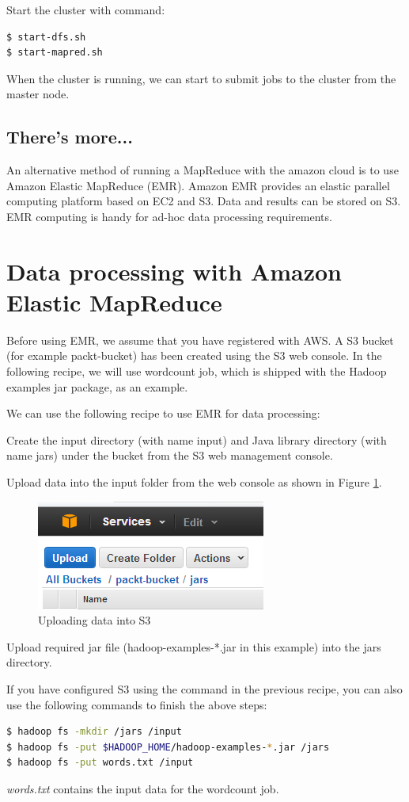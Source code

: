 Start the cluster with command:
\lstset{style=bashstyle}
\begin{lstlisting}[language=bash]
$ start-dfs.sh
$ start-mapred.sh
\end{lstlisting}

When the cluster is running, we can start to submit jobs to the cluster from the master node.
\subsection*{There's more...}
An alternative method of running a MapReduce with the amazon cloud is to use Amazon Elastic MapReduce (EMR). Amazon EMR provides an elastic parallel computing platform based on EC2 and S3. Data and results can be stored on S3. EMR computing is handy for ad-hoc data processing requirements.

\section{Data processing with Amazon Elastic MapReduce}
Before using EMR, we assume that you have registered with AWS. A S3 bucket (for example packt-bucket) has been created using the S3 web console. In the following recipe, we will use wordcount job, which is shipped with the Hadoop examples jar package, as an example.

We can use the following recipe to use EMR for data processing:

Create the input directory (with name input) and Java library directory (with name jars) under the bucket from the S3 web management console.

Upload data into the input folder from the web console as shown in Figure \ref{fig:aws.s3.upload}.
\begin{figure}[ht]
  \centering
  \includegraphics[width=.4\textwidth]{figs/5163os_08_22.png}
  \caption{Uploading data into S3}\label{fig:aws.s3.upload}
\end{figure} 
Upload required jar file (hadoop-examples-*.jar in this example) into the jars directory.

If you have configured S3 using the command in the previous recipe, you can also use the following commands to finish the above steps:
\lstset{style=bashstyle}
\begin{lstlisting}[language=bash]
$ hadoop fs -mkdir /jars /input
$ hadoop fs -put $HADOOP_HOME/hadoop-examples-*.jar /jars
$ hadoop fs -put words.txt /input
\end{lstlisting}
\emph{words.txt} contains the input data for the wordcount job.


